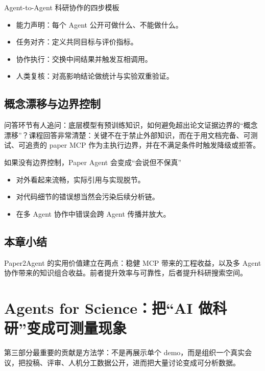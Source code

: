 \documentclass[a4paper]{article}
\begin{document}
\begin{knowledgebox}{Agent-to-Agent 科研协作的四步模板}
\begin{itemize}
    \item 能力声明：每个 Agent 公开可做什么、不能做什么。
    \item 任务对齐：定义共同目标与评价指标。
    \item 协作执行：交换中间结果并触发互相调用。
    \item 人类复核：对高影响结论做统计与实验双重验证。
\end{itemize}
\end{knowledgebox}

\subsection{概念漂移与边界控制}

问答环节有人追问：底层模型有预训练知识，如何避免超出论文证据边界的``概念漂移''？课程回答非常清楚：关键不在于禁止外部知识，而在于用文档完备、可测试、可追责的 paper MCP 作为主执行边界，并在不满足条件时触发降级或拒答。

\begin{warningbox}{如果没有边界控制，Paper Agent 会变成``会说但不保真''}
\begin{itemize}
    \item 对外看起来流畅，实际引用与实现脱节。
    \item 对代码细节的错误想当然会污染后续分析链。
    \item 在多 Agent 协作中错误会跨 Agent 传播并放大。
\end{itemize}
\end{warningbox}

\subsection{本章小结}

Paper2Agent 的实用价值建立在两点：稳健 MCP 带来的工程收益，以及多 Agent 协作带来的知识组合收益。前者提升效率与可靠性，后者提升科研搜索空间。

\section{Agents for Science：把``AI 做科研''变成可测量现象}

第三部分最重要的贡献是方法学：不是再展示单个 demo，而是组织一个真实会议，把投稿、评审、人机分工数据公开，进而把大量讨论变成可分析数据。
\end{document}

